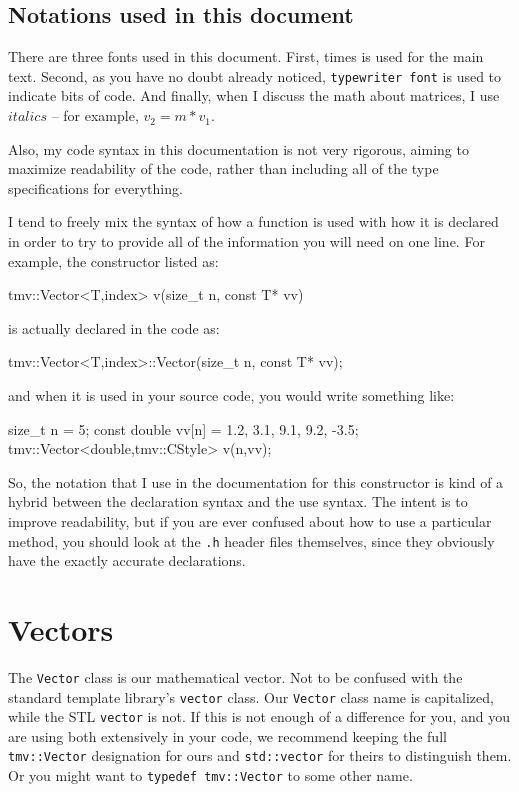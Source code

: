 \documentclass[twoside,letterpaper,11pt]{article}
\renewcommand{\tt}[1]{{\lstinline {#1}}}
\begin{document}
\subsection {Notations used in this document}

There are three fonts used in this document.  First, times is used for the main text.  
Second, as you have no doubt already noticed, \tt{typewriter font} is used to 
indicate bits of code.  And finally, when I discuss the math about matrices, I 
use $italics$ -- for example, $v_2 = m * v_1$.

Also, my code syntax in this documentation is not very rigorous, aiming to maximize
readability of the code, rather than including all of the type specifications for everything.

I tend to freely mix the syntax of how a function is used with how
it is declared in order to try to provide all of the information you will need on one line.  
For example, the constructor listed as:
\begin{tmvcode}
tmv::Vector<T,index> v(size_t n, const T* vv)
\end{tmvcode}
is actually declared in the code as:
\begin{tmvcode}
tmv::Vector<T,index>::Vector(size_t n, const T* vv);
\end{tmvcode}
and when it is used in your source code, you would write something like:
\begin{tmvcode}
size_t n = 5;
const double vv[n] = {1.2, 3.1, 9.1, 9.2, -3.5};
tmv::Vector<double,tmv::CStyle> v(n,vv);
\end{tmvcode}
So, the notation that I use in the documentation for this constructor is kind of a hybrid between the declaration syntax and the use syntax.  The intent is to improve readability, but
if you are ever confused about how to use a particular method, you should look at
the \tt{.h} header files themselves, since they obviously have the exactly accurate
declarations.  

\newpage
\section{Vectors}
\label{Vector}

The \tt{Vector} class is our mathematical vector.  Not to be confused with
the standard template library's \tt{vector} class.  
Our \tt{Vector} class name is capitalized, while the STL \tt{vector} is not.
If this is not enough of a difference for you, and you are using both extensively in your code,
we recommend keeping the full \tt{tmv::Vector} designation for ours and \tt{std::vector}
for theirs to distinguish them.  Or you might want to \tt{typedef tmv::Vector} to some other name.
\end{document}
